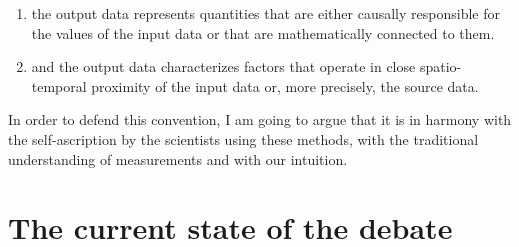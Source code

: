 \documentclass[12pt, a4paper]{article}
\numberwithin{equation}{section}
\begin{document}
\begin{enumerate}
\item the output data represents quantities that are either causally responsible for the values of the input data or that are mathematically connected to them.
\item and the output data characterizes factors that operate in close spatio-temporal proximity of the input data or, more precisely, the source data.
\end{enumerate}

In order to defend this convention, I am going to argue that it is in harmony with the self-ascription by the scientists using these methods, with the traditional understanding of measurements and with our intuition.




\section{The current state of the debate}
\end{document}
